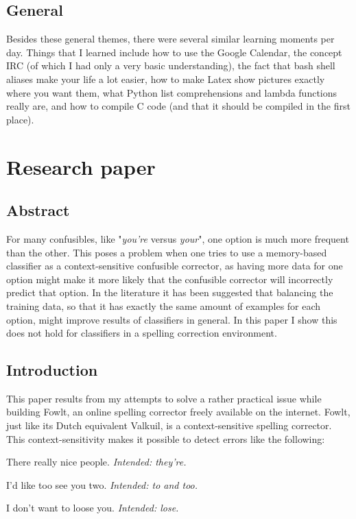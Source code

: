 \documentclass[12pt]{article}
\let\stdsection\section
\renewcommand\section{\newpage\stdsection}
\begin{document}
\subsection{General}

Besides these general themes, there were several similar learning moments per day. Things that I learned include how to use the Google Calendar, the concept IRC (of which I had only a very basic understanding), the fact that bash shell aliases make your life a lot easier, how to make Latex show pictures exactly where you want them, what Python list comprehensions and lambda functions really are, and how to compile C code (and that it should be compiled in the first place).

\section{Research paper}

\subsection*{Abstract}

For many confusibles, like "\emph{you're} versus \emph{your}", one option is much more frequent than the other. This poses a problem when one tries to use a memory-based classifier as a context-sensitive confusible corrector, as having more data for one option might make it more likely that the confusible corrector will incorrectly predict that option. In the literature it has been suggested that balancing the training data, so that it has exactly the same amount of examples for each option, might improve results of classifiers in general. In this paper I show this does not hold for classifiers in a spelling correction environment.

\subsection{Introduction}

This paper results from my attempts to solve a rather practical issue while building Fowlt, an online spelling corrector freely available on the internet. Fowlt, just like its Dutch equivalent Valkuil, is a context-sensitive spelling corrector. This context-sensitivity makes it possible to detect errors like the following:

\begin{examples}

\item There really nice people. \emph{Intended: they're.}
\item I'd like too see you two. \emph{Intended: to and too.}
\item I don't want to loose you. \emph{Intended: lose.}

\end{examples}
\end{document}
